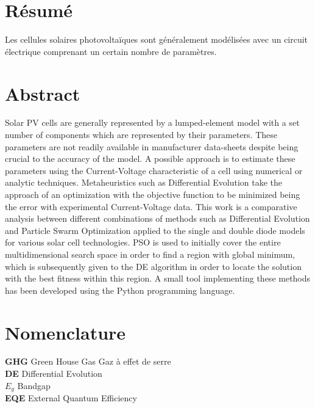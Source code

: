 \section*{Résumé}
Les cellules solaires photovoltaïques sont généralement modélisées avec un circuit électrique comprenant un certain nombre de paramètres.

\section*{Abstract}
Solar PV cells are generally represented by a lumped-element model with a set number of components which are represented by their parameters. These parameters are not readily available in manufacturer data-sheets despite being crucial to the accuracy of the model. A possible approach is to estimate these parameters using the Current-Voltage characteristic of a cell using numerical or analytic techniques. Metaheuristics such as Differential Evolution take the approach of an optimization with the objective function to be minimized being the error with experimental Current-Voltage data. This work is a comparative analysis between different combinations of methods such as Differential Evolution and Particle Swarm Optimization applied to the single and double diode models for various solar cell technologies. PSO is used to initially cover the entire multidimensional search space in order to find a region with global minimum, which is subsequently given to the DE algorithm in order to locate the solution with the best fitness within this region. A small tool implementing these methods has been developed using the Python programming language.

\section*{Nomenclature}
\noindent\textbf{GHG} \hfill Green House Gas \hfill Gaz à effet de serre\\
\textbf{DE} \hfill Differential Evolution \hfill \phantom{}\\
\textbf{$E_g$} \hfill Bandgap\\
\textbf{EQE} \hfill External Quantum Efficiency

\newpage
\tableofcontents
\newpage

